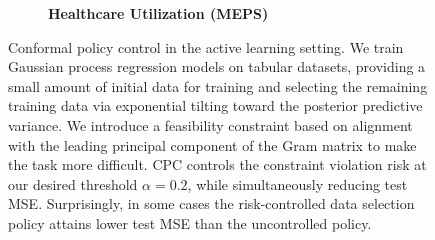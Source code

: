 \begin{figure}[!t]
\begin{subfigure}{0.33\textwidth}
        \centering
        \textbf{Healthcare Utilization (MEPS)}
    \end{subfigure}
\caption{Conformal policy control in the active learning setting. We train Gaussian process regression models on tabular datasets, providing a small amount of initial data for training and selecting the remaining training data via exponential tilting toward the posterior predictive variance. We introduce a feasibility constraint based on alignment with the leading principal component of the Gram matrix to make the task more difficult. CPC controls the constraint violation risk at our desired threshold $\alpha = 0.2$, while simultaneously reducing test MSE. Surprisingly, in some cases the risk-controlled data selection policy attains lower test MSE than the uncontrolled policy.}
\label{fig:AL_enumerated_options}
\end{figure}